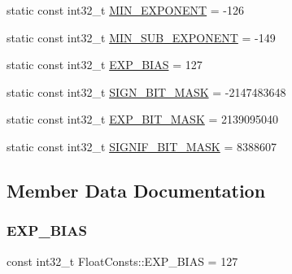 \begin{DoxyCompactItemize}
\item 
static const int32\+\_\+t \mbox{\hyperlink{classlucene_1_1core_1_1util_1_1numeric_1_1FloatConsts_a73a5acf8944ed03d4ac8549a6505e018}{M\+I\+N\+\_\+\+E\+X\+P\+O\+N\+E\+NT}} = -\/126
\item 
static const int32\+\_\+t \mbox{\hyperlink{classlucene_1_1core_1_1util_1_1numeric_1_1FloatConsts_a359974cf2965306bcfab6bee46ce5667}{M\+I\+N\+\_\+\+S\+U\+B\+\_\+\+E\+X\+P\+O\+N\+E\+NT}} = -\/149
\item 
static const int32\+\_\+t \mbox{\hyperlink{classlucene_1_1core_1_1util_1_1numeric_1_1FloatConsts_a2cbb2ed0e9f150f06cab3bf683bd157c}{E\+X\+P\+\_\+\+B\+I\+AS}} = 127
\item 
static const int32\+\_\+t \mbox{\hyperlink{classlucene_1_1core_1_1util_1_1numeric_1_1FloatConsts_abeaf989bd107e90fcb7cb10166cac076}{S\+I\+G\+N\+\_\+\+B\+I\+T\+\_\+\+M\+A\+SK}} = -\/2147483648
\item 
static const int32\+\_\+t \mbox{\hyperlink{classlucene_1_1core_1_1util_1_1numeric_1_1FloatConsts_a4c18c08adda09e475b8a16aab3865fc5}{E\+X\+P\+\_\+\+B\+I\+T\+\_\+\+M\+A\+SK}} = 2139095040
\item 
static const int32\+\_\+t \mbox{\hyperlink{classlucene_1_1core_1_1util_1_1numeric_1_1FloatConsts_a367e85a6f777cfbd0533d8b2d1968d17}{S\+I\+G\+N\+I\+F\+\_\+\+B\+I\+T\+\_\+\+M\+A\+SK}} = 8388607
\end{DoxyCompactItemize}


\subsection{Member Data Documentation}
\mbox{\label{classlucene_1_1core_1_1util_1_1numeric_1_1FloatConsts_a2cbb2ed0e9f150f06cab3bf683bd157c}} 
\subsubsection{\texorpdfstring{E\+X\+P\+\_\+\+B\+I\+AS}{EXP\_BIAS}}
{\footnotesize\ttfamily const int32\+\_\+t Float\+Consts\+::\+E\+X\+P\+\_\+\+B\+I\+AS = 127\hspace{0.3cm}{\ttfamily [static]}}


